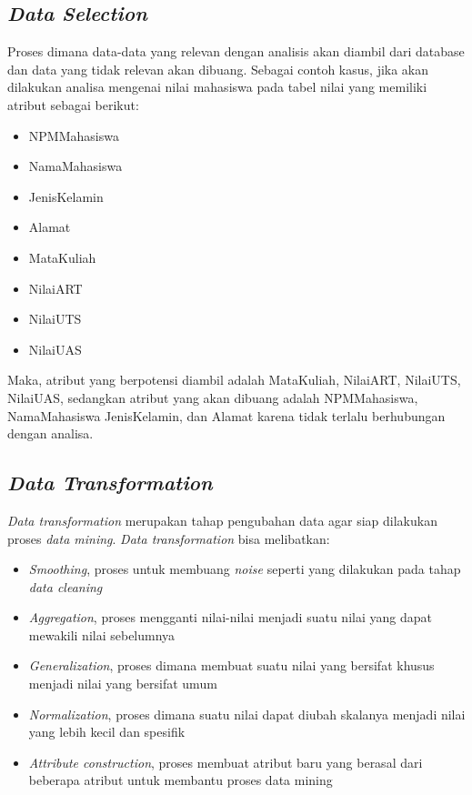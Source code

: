 \subsection{\textsl{Data Selection}}
Proses dimana data-data yang relevan dengan analisis akan diambil dari database dan data yang tidak relevan akan dibuang. Sebagai contoh kasus, jika akan dilakukan analisa mengenai nilai mahasiswa pada tabel nilai yang memiliki atribut sebagai berikut:
	\begin{itemize}
		\item NPMMahasiswa
		\item NamaMahasiswa
		\item JenisKelamin
		\item Alamat
		\item MataKuliah
		\item NilaiART
		\item NilaiUTS
		\item NilaiUAS
	\end{itemize}
Maka, atribut yang berpotensi diambil adalah MataKuliah, NilaiART, NilaiUTS, NilaiUAS, sedangkan atribut yang akan dibuang adalah NPMMahasiswa, NamaMahasiswa JenisKelamin, dan Alamat karena tidak terlalu berhubungan dengan analisa.

\subsection{\textsl{Data Transformation}}
\textsl{Data transformation} merupakan tahap pengubahan data agar siap dilakukan proses \textsl{data mining}. \textsl{Data transformation} bisa melibatkan:
	\begin{itemize}
		\item \textsl{Smoothing}, proses untuk membuang \textsl{noise} seperti yang dilakukan pada tahap \textsl{data cleaning}
		\item \textsl{Aggregation}, proses mengganti nilai-nilai menjadi suatu nilai yang dapat mewakili nilai sebelumnya
		\item \textsl{Generalization}, proses dimana membuat suatu nilai yang bersifat khusus menjadi nilai yang bersifat umum
		\item \textsl{Normalization}, proses dimana suatu nilai dapat diubah skalanya menjadi nilai yang lebih kecil dan spesifik
		\item \textsl{Attribute construction}, proses membuat atribut baru yang berasal dari beberapa atribut untuk membantu proses data mining
	\end{itemize}
	
